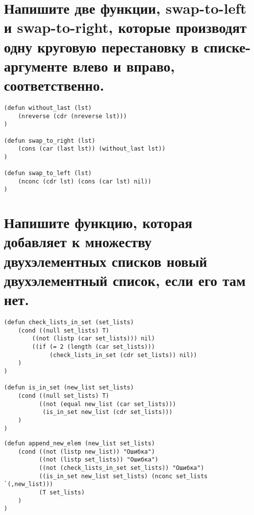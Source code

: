 \newpage
\section{Напишите две функции, swap-to-left и swap-to-right, которые производят одну круговую перестановку в списке-аргументе влево и вправо, соответственно.}
\begin{lstlisting}[basicstyle=\footnotesize, caption=Задание 6]
(defun without_last (lst)
	(nreverse (cdr (nreverse lst)))
)

(defun swap_to_right (lst)
	(cons (car (last lst)) (without_last lst))
)

(defun swap_to_left (lst)
	(nconc (cdr lst) (cons (car lst) nil))
)
\end{lstlisting}

\section{Напишите функцию, которая добавляет к множеству двухэлементных списков новый двухэлементный список, если его там нет.}
\begin{lstlisting}[basicstyle=\footnotesize, caption=Задание 7]
(defun check_lists_in_set (set_lists)
	(cond ((null set_lists) T)
		((not (listp (car set_lists))) nil)
		((if (= 2 (length (car set_lists))) 
		     (check_lists_in_set (cdr set_lists)) nil))
	)
)

(defun is_in_set (new_list set_lists)
	(cond ((null set_lists) T)
		  ((not (equal new_list (car set_lists))) 
		   (is_in_set new_list (cdr set_lists)))
	)
)
\end{lstlisting}
\newpage
\begin{lstlisting}[basicstyle=\footnotesize, caption=Задание 7 (продолжение)]
(defun append_new_elem (new_list set_lists)
	(cond ((not (listp new_list)) "Ошибка")
		  ((not (listp set_lists)) "Ошибка")
 		  ((not (check_lists_in_set set_lists)) "Ошибка")
		  ((is_in_set new_list set_lists) (nconc set_lists `(,new_list)))
		  (T set_lists)
	)
)
\end{lstlisting}

